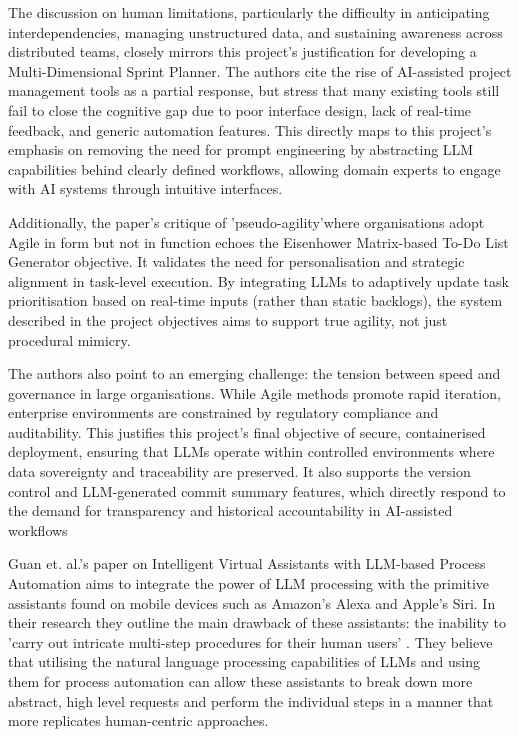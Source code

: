 \documentclass{report}
\begin{document}
The discussion on human limitations, particularly the difficulty in anticipating interdependencies, managing unstructured data, and sustaining awareness across distributed teams, closely mirrors this project's justification for developing a Multi-Dimensional Sprint Planner. The authors cite the rise of AI-assisted project management tools as a partial response, but stress that many existing tools still fail to close the cognitive gap due to poor interface design, lack of real-time feedback, and generic automation features. This directly maps to this project's emphasis on removing the need for prompt engineering by abstracting LLM capabilities behind clearly defined workflows, allowing domain experts to engage with AI systems through intuitive interfaces.

Additionally, the paper's critique of 'pseudo-agility'where organisations adopt Agile in form but not in function echoes the Eisenhower Matrix-based To-Do List Generator objective. It validates the need for personalisation and strategic alignment in task-level execution. By integrating LLMs to adaptively update task prioritisation based on real-time inputs (rather than static backlogs), the system described in the project objectives aims to support true agility, not just procedural mimicry.

The authors also point to an emerging challenge: the tension between speed and governance in large organisations. While Agile methods promote rapid iteration, enterprise environments are constrained by regulatory compliance and auditability. This justifies this project's final objective of secure, containerised deployment, ensuring that LLMs operate within controlled environments where data sovereignty and traceability are preserved. It also supports the version control and LLM-generated commit summary features, which directly respond to the demand for transparency and historical accountability in AI-assisted workflows

Guan et. al.'s paper on Intelligent Virtual Assistants with LLM-based Process Automation aims to integrate the power of LLM processing with the primitive assistants found on mobile devices such as Amazon's Alexa and Apple's Siri. In their research they outline the main drawback of these assistants: the inability to 'carry out intricate multi-step procedures for their human users' \parencite{guanIntelligentVirtualAssistants2023}. They believe that utilising the natural language processing capabilities of LLMs and using them for process automation can allow these assistants to break down more abstract, high level requests and perform the individual steps in a manner that more replicates human-centric approaches.
\end{document}
